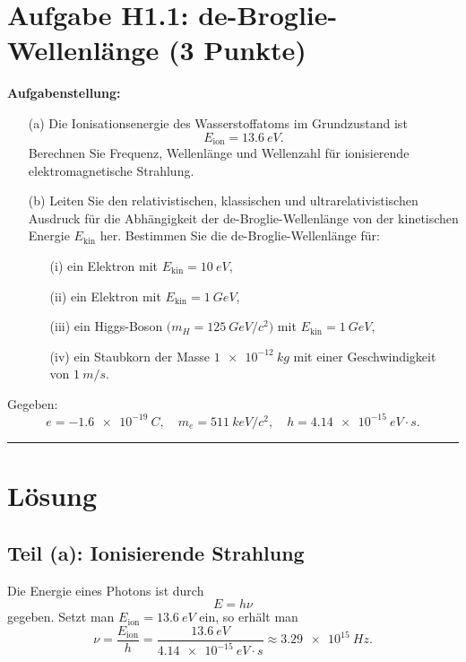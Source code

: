 \documentclass[12pt]{article}
\begin{document}
\section*{Aufgabe H1.1: de-Broglie-Wellenlänge (3 Punkte)}

\textbf{Aufgabenstellung:}

\begin{enumerate}
    \item[(a)] Die Ionisationsenergie des Wasserstoffatoms im Grundzustand ist 
    \[
    E_{\mathrm{ion}} = \SI{13.6}{eV}.
    \]
    Berechnen Sie Frequenz, Wellenlänge und Wellenzahl für ionisierende elektromagnetische Strahlung.
    
    \item[(b)] Leiten Sie den relativistischen, klassischen und ultrarelativistischen Ausdruck für die Abhängigkeit der de-Broglie-Wellenlänge von der kinetischen Energie \(E_{\mathrm{kin}}\) her. Bestimmen Sie die de-Broglie-Wellenlänge für:
    \begin{enumerate}
        \item[(i)] ein Elektron mit \(E_{\mathrm{kin}} = \SI{10}{eV}\),
        \item[(ii)] ein Elektron mit \(E_{\mathrm{kin}} = \SI{1}{GeV}\),
        \item[(iii)] ein Higgs-Boson \(\bigl(m_H = \SI{125}{GeV}/c^2\bigr)\) mit \(E_{\mathrm{kin}} = \SI{1}{GeV}\),
        \item[(iv)] ein Staubkorn der Masse \(\SI{1e-12}{kg}\) mit einer Geschwindigkeit von \(\SI{1}{m/s}\).
    \end{enumerate}
\end{enumerate}

Gegeben:
\[
e = -\SI{1.6e-19}{C}, \quad m_e = \SI{511}{keV}/c^2, \quad h = \SI{4.14e-15}{eV\cdot s}.
\]

\vspace{1em}
\hrule
\vspace{1em}

\section*{Lösung}

\subsection*{Teil (a): Ionisierende Strahlung}

Die Energie eines Photons ist durch
\[
E = h \nu
\]
gegeben. Setzt man \(E_{\mathrm{ion}} = \SI{13.6}{eV}\) ein, so erhält man
\[
\nu = \frac{E_{\mathrm{ion}}}{h} = \frac{\SI{13.6}{eV}}{\SI{4.14e-15}{eV\cdot s}} \approx \SI{3.29e15}{Hz}.
\]
\end{document}
